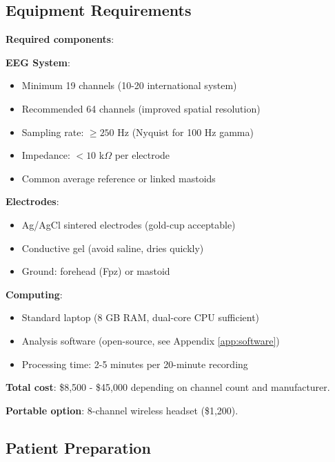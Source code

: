 \subsection{Equipment Requirements}

\begin{theorem}\label{thm:equipment}
\textbf{Required components}:

\textbf{EEG System}:
\begin{itemize}
\item Minimum 19 channels (10-20 international system)
\item Recommended 64 channels (improved spatial resolution)
\item Sampling rate: $\geq 250$ Hz (Nyquist for 100 Hz gamma)
\item Impedance: $< 10$ k$\Omega$ per electrode
\item Common average reference or linked mastoids
\end{itemize}

\textbf{Electrodes}:
\begin{itemize}
\item Ag/AgCl sintered electrodes (gold-cup acceptable)
\item Conductive gel (avoid saline, dries quickly)
\item Ground: forehead (Fpz) or mastoid
\end{itemize}

\textbf{Computing}:
\begin{itemize}
\item Standard laptop (8 GB RAM, dual-core CPU sufficient)
\item Analysis software (open-source, see Appendix \ref{app:software})
\item Processing time: 2-5 minutes per 20-minute recording
\end{itemize}

\textbf{Total cost}: \$8,500 - \$45,000 depending on channel count and manufacturer.

\textbf{Portable option}: 8-channel wireless headset (\$1,200).
\end{theorem}

\subsection{Patient Preparation}

